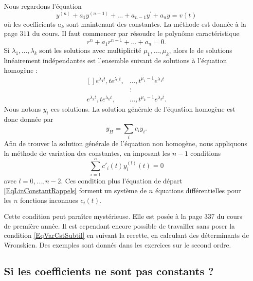 Nous regardons l'équation
\begin{equation}	\label{EqLinConstantRappels}
	y^{(n)} + a_1 y^{(n-1)} + \ldots + a_{n-1} y^\prime + a_n y = v(t)
\end{equation}
où les coefficients $a_k$ sont maintenant des constantes. La méthode est donnée à la page $311$ du cours. Il faut commencer par résoudre le polynôme caractéristique
\begin{equation}
	r^n+a_1 r^{n-1}+\ldots +a_n=0.
\end{equation}
Si $\lambda_1,\ldots,\lambda_k$ sont les solutions avec multiplicité $\mu_1,\ldots,\mu_k$, alors le  de solutions linéairement indépendantes est l'ensemble suivant de solutions à l'équation homogène :
\begin{equation}
	\begin{aligned}[]
		 e^{\lambda_1 t},t e^{\lambda_1 t},	&	\ldots,t^{\mu_1-1} e^{\lambda_1  t}\\
							&\vdots\\
		 e^{\lambda_k t},t e^{\lambda_k t},	&\ldots,t^{\mu_k-1} e^{\lambda_k  t}.
	\end{aligned}
\end{equation}
Nous notons $y_i$ ces solutions. La solution générale de l'équation homogène est donc donnée par
\begin{equation}
	y_H=\sum_i c_i y_i.
\end{equation}
Afin de trouver la solution générale de l'équation non homogène, nous appliquons la méthode de variation des constantes, en imposant les $n-1$ conditions
\begin{equation}		\label{EqVarCstSubtil}
	\sum_{i=1}^n c'_i(t)y_i^{(l)}(t)=0
\end{equation}
avec $l=0,\ldots,n-2$. Ces condition plus l'équation de départ \eqref{EqLinConstantRappels} forment un système de $n$ équations différentielles pour les $n$ fonctions inconnues $c_i(t)$.

Cette condition peut paraître mystérieuse. Elle est posée à la page 337 du cours de première année. Il est cependant encore possible de travailler sans poser la condition \eqref{EqVarCstSubtil} en suivant la recette, en calculant des déterminants de Wronskien. Des exemples sont donnés dans les exercices sur le second ordre.

\subsection{Si les coefficients ne sont pas constants ?}

